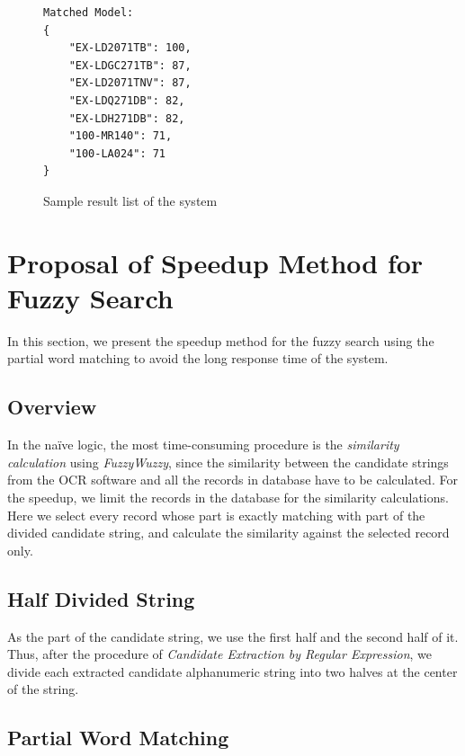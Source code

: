 \documentclass[technicalreport]{ieicej}
\begin{document}
        \begin{figure}[t] 
            \begin{center}
                \begin{BVerbatim}
Matched Model:
{
    "EX-LD2071TB": 100,
    "EX-LDGC271TB": 87,
    "EX-LD2071TNV": 87,
    "EX-LDQ271DB": 82,
    "EX-LDH271DB": 82,
    "100-MR140": 71,
    "100-LA024": 71
}
                \end{BVerbatim}
            \end{center}
            \caption{Sample result list of the system}
            \label{fig:result-sample}
        \end{figure}


\section{Proposal of Speedup Method for Fuzzy Search}
\label{sec:speedup}
    In this section, we present the speedup method for the fuzzy search using the partial word matching to avoid the long response time of the system.

    \subsection{Overview}
        In the naïve logic, the most time-consuming procedure is the {\em similarity calculation} using {\em FuzzyWuzzy}, since the similarity between the candidate strings from the OCR software and all the records in database have to be calculated. For the speedup, we limit the records in the database for the similarity calculations. Here we select every record whose part is exactly matching with part of the divided candidate string, and calculate the similarity against the selected record only.

    \subsection{Half Divided String}
        As the part of the candidate string, we use the first half and the second half of it. Thus, after the procedure of {\em Candidate Extraction by Regular Expression}, we divide each extracted candidate alphanumeric string into two halves at the center of the string.

    \subsection{Partial Word Matching}
\end{document}
